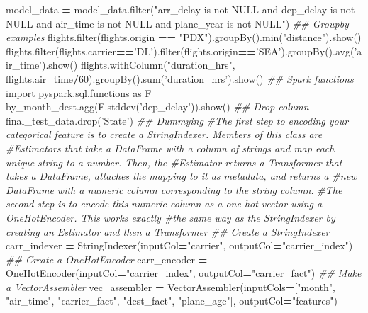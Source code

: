 \documentclass[]{book}
\newenvironment{Shaded}{\begin{snugshade}}{\end{snugshade}}
\newcommand{\DecValTok}[1]{\textcolor[rgb]{0.00,0.00,0.81}{#1}}
\newcommand{\StringTok}[1]{\textcolor[rgb]{0.31,0.60,0.02}{#1}}
\newcommand{\ImportTok}[1]{#1}
\newcommand{\CommentTok}[1]{\textcolor[rgb]{0.56,0.35,0.01}{\textit{#1}}}
\newcommand{\OperatorTok}[1]{\textcolor[rgb]{0.81,0.36,0.00}{\textbf{#1}}}
\newcommand{\BuiltInTok}[1]{#1}
\newcommand{\NormalTok}[1]{#1}
\begin{document}
\begin{Shaded}
\begin{Highlighting}[]
\NormalTok{model_data }\OperatorTok{=}\NormalTok{ model_data.}\BuiltInTok{filter}\NormalTok{(}\StringTok{"arr_delay is not NULL and dep_delay is not NULL and air_time is not NULL and plane_year is not NULL"}\NormalTok{)}
\CommentTok{## Groupby examples}
\NormalTok{flights.}\BuiltInTok{filter}\NormalTok{(flights.origin }\OperatorTok{==} \StringTok{"PDX"}\NormalTok{).groupBy().}\BuiltInTok{min}\NormalTok{(}\StringTok{"distance"}\NormalTok{).show()}
\NormalTok{flights.}\BuiltInTok{filter}\NormalTok{(flights.carrier}\OperatorTok{==}\StringTok{'DL'}\NormalTok{).}\BuiltInTok{filter}\NormalTok{(flights.origin}\OperatorTok{==}\StringTok{'SEA'}\NormalTok{).groupBy().avg(}\StringTok{'air_time'}\NormalTok{).show()}
\NormalTok{flights.withColumn(}\StringTok{"duration_hrs"}\NormalTok{, flights.air_time}\OperatorTok{/}\DecValTok{60}\NormalTok{).groupBy().}\BuiltInTok{sum}\NormalTok{(}\StringTok{'duration_hrs'}\NormalTok{).show()}
\CommentTok{## Spark functions}
\ImportTok{import}\NormalTok{ pyspark.sql.functions }\ImportTok{as}\NormalTok{ F}
\NormalTok{by_month_dest.agg(F.stddev(}\StringTok{'dep_delay'}\NormalTok{)).show()}
\CommentTok{## Drop column}
\NormalTok{final_test_data.drop(}\StringTok{'State'}\NormalTok{)}
\CommentTok{## Dummying}
\CommentTok{#The first step to encoding your categorical feature is to create a StringIndexer. Members of this class are #Estimators that take a DataFrame with a column of strings and map each unique string to a number. Then, the #Estimator returns a Transformer that takes a DataFrame, attaches the mapping to it as metadata, and returns a #new DataFrame with a numeric column corresponding to the string column.}
\CommentTok{#The second step is to encode this numeric column as a one-hot vector using a OneHotEncoder. This works exactly #the same way as the StringIndexer by creating an Estimator and then a Transformer}
\CommentTok{## Create a StringIndexer}
\NormalTok{carr_indexer }\OperatorTok{=}\NormalTok{ StringIndexer(inputCol}\OperatorTok{=}\StringTok{"carrier"}\NormalTok{, outputCol}\OperatorTok{=}\StringTok{"carrier_index"}\NormalTok{)}
\CommentTok{## Create a OneHotEncoder}
\NormalTok{carr_encoder }\OperatorTok{=}\NormalTok{ OneHotEncoder(inputCol}\OperatorTok{=}\StringTok{"carrier_index"}\NormalTok{, outputCol}\OperatorTok{=}\StringTok{"carrier_fact"}\NormalTok{)}
\CommentTok{## Make a VectorAssembler}
\NormalTok{vec_assembler }\OperatorTok{=}\NormalTok{ VectorAssembler(inputCols}\OperatorTok{=}\NormalTok{[}\StringTok{"month"}\NormalTok{, }\StringTok{"air_time"}\NormalTok{, }\StringTok{"carrier_fact"}\NormalTok{, }\StringTok{"dest_fact"}\NormalTok{, }\StringTok{"plane_age"}\NormalTok{], outputCol}\OperatorTok{=}\StringTok{"features"}\NormalTok{)}

\end{Highlighting}
\end{Shaded}
\end{document}
